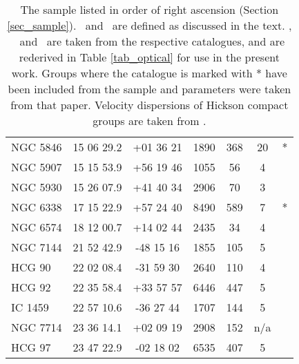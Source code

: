 \begin{table*}
\begin{center}
\begin{tabular}{@{}lcccccr@{}}
NGC 5846  &  15 06 29.2  &  +01 36 21  &  1890      &  368        &  20       &  *\citet{mulchaey98}   \\
NGC 5907  &  15 15 53.9  &  +56 19 46  &  1055      &  56         &  4        &  \citet{geller83}      \\
NGC 5930  &  15 26 07.9  &  +41 40 34  &  2906      &  70         &  3        &  \citet{ramella97}     \\
NGC 6338  &  17 15 22.9  &  +57 24 40  &  8490      &  589        &  7        &  *\citet{ledlow96}     \\
NGC 6574  &  18 12 00.7  &  +14 02 44  &  2435      &  34         &  4        &  \citet{garcia93}      \\
NGC 7144  &  21 52 42.9  &  -48 15 16  &  1855      &  105        &  5        &  \citet{garcia93}      \\
HCG 90    &  22 02 08.4  &  -31 59 30  &  2640      &  110        &  4        &  \citet{hickson82}     \\
HCG 92    &  22 35 58.4  &  +33 57 57  &  6446      &  447        &  5        &  \citet{hickson82}     \\
IC  1459  &  22 57 10.6  &  -36 27 44  &  1707      &  144        &  5        &  \citet{garcia93}      \\
NGC 7714  &  23 36 14.1  &  +02 09 19  &  2908      &  152        &  n/a      &  \citet{fouque92}      \\
HCG 97    &  23 47 22.9  &  -02 18 02  &  6535      &  407        &  5        &  \citet{hickson82}     \\


\hline
\end{tabular}
\end{center}


\caption
{\label{tab_sample}
The sample listed in order of right ascension (Section \ref{sec_sample}).  \RA\
and \Dec\ are defined as discussed in the text.  \vel, \sigmav\ and \Ngal\ are
taken from the respective catalogues, and are rederived in Table \ref{tab_optical}
for use in the present work.  Groups where the catalogue is marked with * have
been included from the \citet{helsdon00a} sample and parameters were taken from
that paper. Velocity dispersions of Hickson compact groups are taken from
\citet{ponman96}.}


\end{table*}
